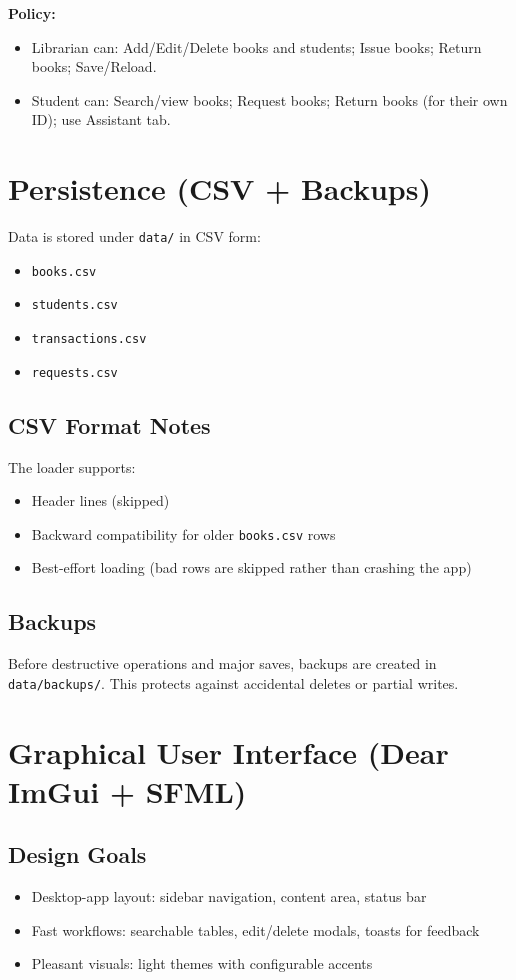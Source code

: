 \documentclass[11pt,a4paper]{article}
\begin{document}
\textbf{Policy:}
\begin{itemize}
  \item Librarian can: Add/Edit/Delete books and students; Issue books; Return books; Save/Reload.
  \item Student can: Search/view books; Request books; Return books (for their own ID); use Assistant tab.
\end{itemize}

\section{Persistence (CSV + Backups)}
Data is stored under \texttt{data/} in CSV form:
\begin{itemize}
  \item \texttt{books.csv}
  \item \texttt{students.csv}
  \item \texttt{transactions.csv}
  \item \texttt{requests.csv}
\end{itemize}

\subsection{CSV Format Notes}
The loader supports:
\begin{itemize}
  \item Header lines (skipped)
  \item Backward compatibility for older \texttt{books.csv} rows
  \item Best-effort loading (bad rows are skipped rather than crashing the app)
\end{itemize}

\subsection{Backups}
Before destructive operations and major saves, backups are created in \texttt{data/backups/}.
This protects against accidental deletes or partial writes.

\section{Graphical User Interface (Dear ImGui + SFML)}
\subsection{Design Goals}
\begin{itemize}
  \item Desktop-app layout: sidebar navigation, content area, status bar
  \item Fast workflows: searchable tables, edit/delete modals, toasts for feedback
  \item Pleasant visuals: light themes with configurable accents
\end{itemize}
\end{document}
